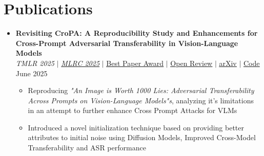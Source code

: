 \documentclass[letterpaper,11pt]{article}
\newcommand{\resumeItem}[1]{
  \item\small{
    {#1 \vspace{-2pt}}
  }
}
\begin{document}
\section{Publications}
    \begin{itemize}[leftmargin=0.15in, label={}]

    \item
    \textbf{Revisiting CroPA: A Reproducibility Study and Enhancements for Cross-Prompt Adversarial Transferability in Vision-Language Models} \\
    \textit{TMLR 2025} $|$
    \href{https://reproml.org/}{\textit{MLRC 2025}} $|$
    \faStar { }\href{https://x.com/repro_challenge/status/1954935709380247575}{\underline{Best Paper Award}}
    $|$ \faEye { }\href{https://openreview.net/forum?id=5L90cl0xtf&noteId=7yskfQI5KW}{\underline{Open Review}}
    $|$
    \faFilePdfO { }\href{https://arxiv.org/abs/2506.22982}{\underline{arXiv}}    
    $|$ 
    \faGithub { }\href{https://github.com/Swadesh06/Revisting_CroPA}{\underline{Code}}
    {\hfill June 2025}
      \begin{itemize}
        \resumeItem{Reproducing \textit{"An Image is Worth 1000 Lies: Adversarial Transferability Across Prompts on Vision-Language Models"s}, analyzing it's limitations in an attempt to further enhance Cross Prompt Attacks for VLMs}
        \resumeItem{Introduced a novel initialization technique based on providing better attributes to initial noise using Diffusion Models, Improved Cross-Model Transferability and ASR performance}
      \end{itemize}


      \clearpage

      



\end{itemize}
\end{document}

